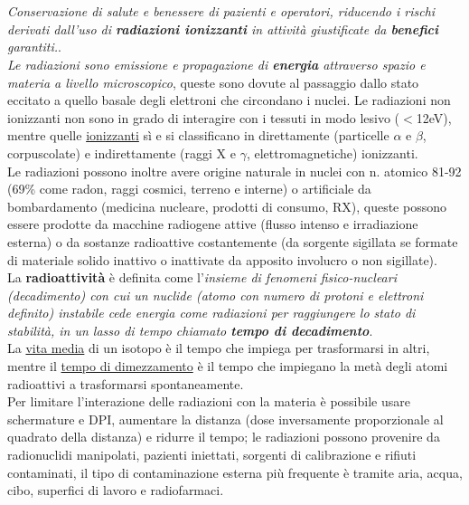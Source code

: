 \documentclass[10pt]{article}
\begin{document}
\tableofcontents
\pagebreak
\section{}
\textit{Conservazione di salute e benessere di pazienti e operatori, riducendo i rischi derivati dall'uso di \textbf{radiazioni ionizzanti} in attività giustificate da \textbf{benefici} garantiti.}.\\
\textit{Le radiazioni sono emissione e propagazione di \textbf{energia} attraverso spazio e materia a livello microscopico}, queste sono dovute al passaggio dallo stato eccitato a quello basale degli elettroni che circondano i nuclei. Le radiazioni non ionizzanti non sono in grado di interagire con i tessuti in modo lesivo ($<$12eV), mentre quelle \underline{ionizzanti} sì e si classificano in direttamente (particelle $\alpha$ e $\beta$, corpuscolate) e indirettamente (raggi X e $\gamma$, elettromagnetiche) ionizzanti. \\
Le radiazioni possono inoltre avere origine naturale in nuclei con n. atomico 81-92 (69\% come radon, raggi cosmici, terreno e interne) o artificiale da bombardamento (medicina nucleare, prodotti di consumo, RX), queste possono essere prodotte da macchine radiogene attive (flusso intenso e irradiazione esterna) o da sostanze radioattive costantemente (da sorgente sigillata se formate di materiale solido inattivo o inattivate da apposito involucro o non sigillate).\\
La \textbf{radioattività} è definita come l'\textit{insieme di fenomeni fisico-nucleari (decadimento) con cui un nuclide (atomo con numero di protoni e elettroni definito) instabile cede energia come radiazioni per raggiungere lo stato di stabilità, in un lasso di tempo chiamato \textbf{tempo di decadimento}}.\\
La \underline{vita media} di un isotopo è il tempo che impiega per trasformarsi in altri, mentre il \underline{tempo di dimezzamento} è il tempo che impiegano la metà degli atomi radioattivi a trasformarsi spontaneamente. \\
Per limitare l'interazione delle radiazioni con la materia è possibile usare schermature e DPI, aumentare la distanza (dose inversamente proporzionale al quadrato della distanza) e ridurre il tempo; le radiazioni possono provenire da radionuclidi manipolati, pazienti iniettati, sorgenti di calibrazione e rifiuti contaminati, il tipo di contaminazione esterna più frequente è tramite aria, acqua, cibo, superfici di lavoro e radiofarmaci.\\
\end{document}
